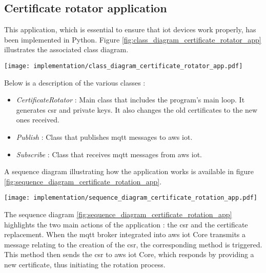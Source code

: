 \subsection{Certificate rotator application}
This application, which is essential to ensure that \acrshort{iot} devices work properly, has been implemented in Python. Figure \ref{fig:class_diagram_certificate_rotator_app} illustrates the associated class diagram.
\begin{center}
    \begingroup
    \texttt{[image: implementation/class\_diagram\_certificate\_rotator\_app.pdf]}
    \label{fig:class_diagram_certificate_rotator_app}
    \endgroup
\end{center}
Below is a description of the various classes :
\begin{itemize}
    \item \textit{CertificateRotator} : Main class that includes the program's main loop. It generates \acrshort{csr} and private keys. It also changes the old certificates to the new ones received.
    \item \textit{Publish} : Class that publishes \acrshort{mqtt} messages to \gls{aws} \acrshort{iot}.
    \item \textit{Subscribe} : Class that receives \acrshort{mqtt} messages from \gls{aws} \acrshort{iot}.
\end{itemize}
A sequence diagram illustrating how the application works is available in figure \ref{fig:sequence_diagram_certificate_rotation_app}.
\begin{center}
    \begingroup
    \texttt{[image: implementation/sequence\_diagram\_certificate\_rotation\_app.pdf]}
    \label{fig:sequence_diagram_certificate_rotation_app}
    \endgroup
\end{center}
The sequence diagram \ref{fig:sequence_diagram_certificate_rotation_app} highlights the two main actions of the application : the \acrfull{csr} and the certificate replacement. When the \acrshort{mqtt} broker integrated into \gls{aws} \acrshort{iot} Core transmits a message relating to the creation of the \acrshort{csr}, the corresponding method is triggered. This method then sends the \acrshort{csr} to \gls{aws} \acrshort{iot} Core, which responds by providing a new certificate, thus initiating the rotation process.

